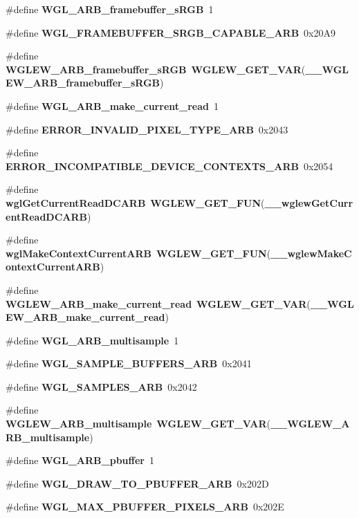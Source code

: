 \begin{DoxyCompactItemize}
\item 
\#define {\bf W\+G\+L\+\_\+\+A\+R\+B\+\_\+framebuffer\+\_\+s\+R\+GB}~1
\item 
\#define {\bf W\+G\+L\+\_\+\+F\+R\+A\+M\+E\+B\+U\+F\+F\+E\+R\+\_\+\+S\+R\+G\+B\+\_\+\+C\+A\+P\+A\+B\+L\+E\+\_\+\+A\+RB}~0x20\+A9
\item 
\#define {\bf W\+G\+L\+E\+W\+\_\+\+A\+R\+B\+\_\+framebuffer\+\_\+s\+R\+GB}~{\bf W\+G\+L\+E\+W\+\_\+\+G\+E\+T\+\_\+\+V\+AR}({\bf \+\_\+\+\_\+\+W\+G\+L\+E\+W\+\_\+\+A\+R\+B\+\_\+framebuffer\+\_\+s\+R\+GB})
\item 
\#define {\bf W\+G\+L\+\_\+\+A\+R\+B\+\_\+make\+\_\+current\+\_\+read}~1
\item 
\#define {\bf E\+R\+R\+O\+R\+\_\+\+I\+N\+V\+A\+L\+I\+D\+\_\+\+P\+I\+X\+E\+L\+\_\+\+T\+Y\+P\+E\+\_\+\+A\+RB}~0x2043
\item 
\#define {\bf E\+R\+R\+O\+R\+\_\+\+I\+N\+C\+O\+M\+P\+A\+T\+I\+B\+L\+E\+\_\+\+D\+E\+V\+I\+C\+E\+\_\+\+C\+O\+N\+T\+E\+X\+T\+S\+\_\+\+A\+RB}~0x2054
\item 
\#define {\bf wgl\+Get\+Current\+Read\+D\+C\+A\+RB}~{\bf W\+G\+L\+E\+W\+\_\+\+G\+E\+T\+\_\+\+F\+UN}({\bf \+\_\+\+\_\+wglew\+Get\+Current\+Read\+D\+C\+A\+RB})
\item 
\#define {\bf wgl\+Make\+Context\+Current\+A\+RB}~{\bf W\+G\+L\+E\+W\+\_\+\+G\+E\+T\+\_\+\+F\+UN}({\bf \+\_\+\+\_\+wglew\+Make\+Context\+Current\+A\+RB})
\item 
\#define {\bf W\+G\+L\+E\+W\+\_\+\+A\+R\+B\+\_\+make\+\_\+current\+\_\+read}~{\bf W\+G\+L\+E\+W\+\_\+\+G\+E\+T\+\_\+\+V\+AR}({\bf \+\_\+\+\_\+\+W\+G\+L\+E\+W\+\_\+\+A\+R\+B\+\_\+make\+\_\+current\+\_\+read})
\item 
\#define {\bf W\+G\+L\+\_\+\+A\+R\+B\+\_\+multisample}~1
\item 
\#define {\bf W\+G\+L\+\_\+\+S\+A\+M\+P\+L\+E\+\_\+\+B\+U\+F\+F\+E\+R\+S\+\_\+\+A\+RB}~0x2041
\item 
\#define {\bf W\+G\+L\+\_\+\+S\+A\+M\+P\+L\+E\+S\+\_\+\+A\+RB}~0x2042
\item 
\#define {\bf W\+G\+L\+E\+W\+\_\+\+A\+R\+B\+\_\+multisample}~{\bf W\+G\+L\+E\+W\+\_\+\+G\+E\+T\+\_\+\+V\+AR}({\bf \+\_\+\+\_\+\+W\+G\+L\+E\+W\+\_\+\+A\+R\+B\+\_\+multisample})
\item 
\#define {\bf W\+G\+L\+\_\+\+A\+R\+B\+\_\+pbuffer}~1
\item 
\#define {\bf W\+G\+L\+\_\+\+D\+R\+A\+W\+\_\+\+T\+O\+\_\+\+P\+B\+U\+F\+F\+E\+R\+\_\+\+A\+RB}~0x202D
\item 
\#define {\bf W\+G\+L\+\_\+\+M\+A\+X\+\_\+\+P\+B\+U\+F\+F\+E\+R\+\_\+\+P\+I\+X\+E\+L\+S\+\_\+\+A\+RB}~0x202E

\end{DoxyCompactItemize}
